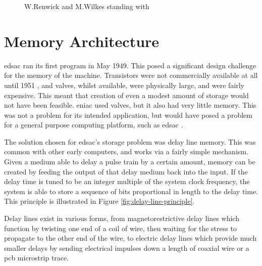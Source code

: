 \begin{figure}[ht]
	\centering
	\caption{W.Renwick and M.Wilkes standing with  \cite{cam2011b}}
	\label{fig:edsac-photo}
\end{figure}

\section{ Memory Architecture} \label{sec:edsac-mem-arch}
\Gls{edsac} ran its first program in May 1949. This posed a significant design challenge for the memory of the machine. Transistors were not commercially available at all until 1951 \cite{bonne2007}, and valves, whilst available, were physically large, and were fairly expensive. This meant that creation of even a modest amount of storage would not have been feasible. \Gls{eniac} used valves, but it also had very little memory. This was not a problem for its intended application, but would have posed a problem for a general purpose computing platform, such as \gls{edsac} \cite[p.208]{wilkes1948}.

The solution chosen for \gls{edsac}'s storage problem was delay line memory. This was common with other early computers, and works via a fairly simple mechanism. Given a medium able to delay a pulse train by a certain amount, memory can be created by feeding the output of that delay medium back into the input. If the delay time is tuned to be an integer multiple of the system clock frequency, the system is able to store a sequence of bits proportional in length to the delay time. This principle is illustrated in Figure \ref{fig:delay-line-principle}.

Delay lines exist in various forms, from magnetorestrictive delay lines which function by twisting one end of a coil of wire, then waiting for the stress to propagate to the other end of the wire, to electric delay lines which provide much smaller delays by sending electrical impulses down a length of coaxial wire or a \gls{pcb} microstrip trace.

